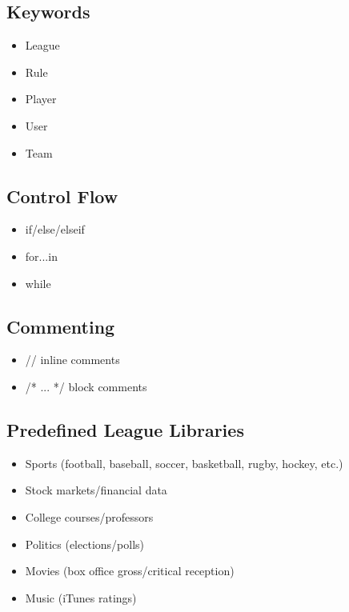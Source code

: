 \documentclass[12pt]{article}
\begin{document}
\subsection{Keywords}
\begin{itemize}
\setlength{\itemsep}{1pt}
\item League
\item Rule
\item Player
\item User
\item Team
\end{itemize}

\subsection{Control Flow}
\begin{itemize}
\setlength{\itemsep}{1pt}
\item if/else/elseif
\item for...in
\item while
\end{itemize}

\subsection{Commenting}
\begin{itemize}
\setlength{\itemsep}{1pt}
\item // inline comments
\item /* ... */ block comments
\end{itemize}

\subsection{Predefined League Libraries}
\begin{itemize}
\setlength{\itemsep}{1pt}
\item Sports (football, baseball, soccer, basketball, rugby, hockey, etc.)
\item Stock markets/financial data
\item College courses/professors
\item Politics (elections/polls)
\item Movies (box office gross/critical reception)
\item Music (iTunes ratings)
\end{itemize}
\end{document}
